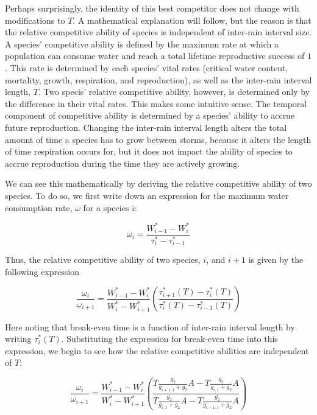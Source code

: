 \documentclass[11pt]{article}
\begin{document}
Perhaps surprisingly, the identity of this best competitor does not change with modifications to \(T\). A mathematical explanation will follow, but the reason is that the relative competitive ability of species is independent of inter-rain interval size. A species' competitive ability is defined by the maximum rate at which a population can consume water and reach a total lifetime reproductive success of \(1\). This rate is determined by each species' vital rates (critical water content, mortality, growth, respiration, and reproduction), as well as the inter-rain interval length, \(T\). Two specis' relative competitive ability, however, is determined only by the difference in their vital rates. This makes some intuitive sense. The temporal component of competitive ability is determined by a species' ability to accrue future reproduction. Changing the inter-rain interval length alters the total amount of time a species has to grow between storms, because it alters the length of time respiration occurs for, but it does not impact the ability of species to accrue reproduction during the time they are actively growing.

We can see this mathematically by deriving the relative competitive ability of two species. To do so, we first write down an expression for the maximum water consumption rate, \(\omega\) for a species \(i\):

\begin{equation}
    \omega_i = \frac{W_{i-1}^* - W_i^*}{\tau_i^* - \tau_{i-1}^*}
\end{equation}

Thus, the relative competitive ability of two species, \(i\), and \(i+1\) is given by the following expression

\begin{equation}
    \frac{\omega_i}{\omega_{i+1}} = \frac{W_{i-1}^* - W_i^*}{W_{i}^* - W_{i+1}^*} \left( \frac{\tau_{i+1}^*(T) - \tau_i^*(T)}{\tau_i^*(T) - \tau_{i-1}^*(T)} \right)
\end{equation}

Here noting that break-even time is a function of inter-rain interval length by writing \(\tau_i^* (T)\). Substituting the expression for break-even time into this expression, we begin to see how the relative competitive abilities are independent of \(T\):

\begin{equation*}
    \frac{\omega_i}{\omega_{i+1}} = \frac{W_{i-1}^* - W_i^*}{W_{i}^* - W_{i+1}^*} \left( \frac{T \frac{g_2}{g_{i+1,1} + g_2} A - T \frac{g_2}{g_{i,1} + g_2} A}{T \frac{g_2}{g_{i,1} + g_2} A - T \frac{g_2}{g_{i-1,1} + g_2} A} \right)
\end{equation*}
\end{document}
